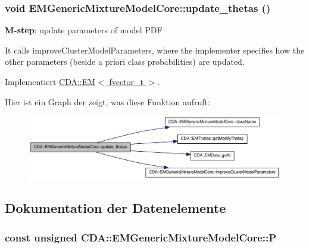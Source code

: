 \hypertarget{classCDA_1_1EMGenericMixtureModelCore_a12c68e86652d9a723ca0716f7676b360}{
\subsubsection[{update\_\-thetas}]{\setlength{\rightskip}{0pt plus 5cm}void EMGenericMixtureModelCore::update\_\-thetas ()}}
\label{classCDA_1_1EMGenericMixtureModelCore_a12c68e86652d9a723ca0716f7676b360}


{\bfseries M-\/step}: update parameters of model PDF 

It calls improveClusterModelParameters, where the implementer specifies how the other parameters (beside a priori class probabilities) are updated. 

Implementiert \hyperlink{classCDA_1_1EM_a58f0d0cf682d55a53e827744e03516e2}{CDA::EM$<$ fvector\_\-t $>$}.



Hier ist ein Graph der zeigt, was diese Funktion aufruft:\nopagebreak
\begin{figure}[H]
\begin{center}
\leavevmode
\includegraphics[width=317pt]{classCDA_1_1EMGenericMixtureModelCore_a12c68e86652d9a723ca0716f7676b360_cgraph}
\end{center}
\end{figure}




\subsection{Dokumentation der Datenelemente}
\hypertarget{classCDA_1_1EMGenericMixtureModelCore_a591c27390e7a8f84249f27d88c10d2b7}{
\subsubsection[{P}]{\setlength{\rightskip}{0pt plus 5cm}const unsigned {\bf CDA::EMGenericMixtureModelCore::P}}}
\label{classCDA_1_1EMGenericMixtureModelCore_a591c27390e7a8f84249f27d88c10d2b7}


